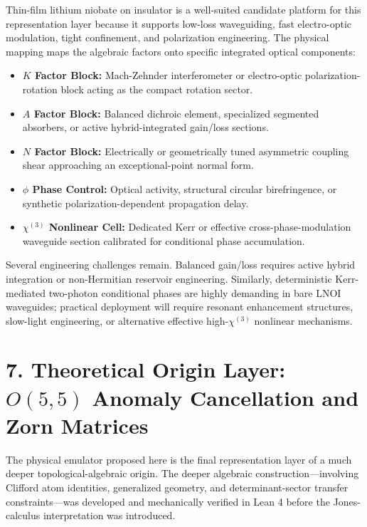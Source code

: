 \documentclass[aps,prl,twocolumn,superscriptaddress,amsmath,amssymb]{revtex4-2}
\begin{document}
Thin-film lithium niobate on insulator is a well-suited candidate platform for this representation layer because it supports low-loss waveguiding, fast electro-optic modulation, tight confinement, and polarization engineering. The physical mapping maps the algebraic factors onto specific integrated optical components:
\begin{itemize}
\item \textbf{$K$ Factor Block:} Mach-Zehnder interferometer or electro-optic polarization-rotation block acting as the compact rotation sector.
\item \textbf{$A$ Factor Block:} Balanced dichroic element, specialized segmented absorbers, or active hybrid-integrated gain/loss sections.
\item \textbf{$N$ Factor Block:} Electrically or geometrically tuned asymmetric coupling shear approaching an exceptional-point normal form.
\item \textbf{$\phi$ Phase Control:} Optical activity, structural circular birefringence, or synthetic polarization-dependent propagation delay.
\item \textbf{$\chi^{(3)}$ Nonlinear Cell:} Dedicated Kerr or effective cross-phase-modulation waveguide section calibrated for conditional phase accumulation.
\end{itemize}

Several engineering challenges remain. Balanced gain/loss requires active hybrid integration or non-Hermitian reservoir engineering. Similarly, deterministic Kerr-mediated two-photon conditional phases are highly demanding in bare LNOI waveguides; practical deployment will require resonant enhancement structures, slow-light engineering, or alternative effective high-$\chi^{(3)}$ nonlinear mechanisms.

\section{7. Theoretical Origin Layer: $O(5,5)$ Anomaly Cancellation and Zorn Matrices}

The physical emulator proposed here is the final representation layer of a much deeper topological-algebraic origin. The deeper algebraic construction—involving Clifford atom identities, generalized geometry, and determinant-sector transfer constraints—was developed and mechanically verified in Lean 4 before the Jones-calculus interpretation was introduced. 
\end{document}
